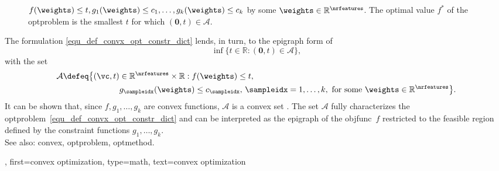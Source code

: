 {{\begin{figure}
{  $f(\weights) \leq t, g_{1}(\weights)\leq c_{1},\ldots, g_{k}(\weights) \leq c_{k}$ 
  by some $\weights \in \mathbb{R}^{\nrfeatures}$. The optimal value $f^{\ast}$ of the 
  \gls{optproblem} is the smallest $t$ for which $(\mathbf{0},t) \in \mathcal{A}$. }
\end{figure}
	The formulation \eqref{equ_def_convx_opt_constr_dict} lends, in turn, to the 
	epigraph form of \cite[Sec 5.3]{BoydConvexBook} 
	$$\inf \big\{ t \in \mathbb{R} : (\mathbf{0}, t) \in \mathcal{A} \big\},$$ 
	with the set 
	\begin{align} 
	\mathcal{A} \defeq 
    \big\{ (\vc,t) & \in \mathbb{R}^{\nrfeatures} \times \mathbb{R} : 
    f(\weights) \leq t, \, \nonumber \\ 
   &  g_{\sampleidx}(\weights) \leq c_{\sampleidx}, \,
    \sampleidx = 1,\ldots,k, 
    \text{ for some } \weights \in \mathbb{R}^{\nrfeatures} \big\}. \nonumber
	\end{align}
	It can be shown that, since $f,g_{1},\ldots,g_{k}$ are \gls{convex} \glspl{function}, 
    $\mathcal{A}$ is a \gls{convex} set \cite[Ch.2]{BoydConvexBook}.
	The set $\mathcal{A}$ fully characterizes the \gls{optproblem}~\eqref{equ_def_convx_opt_constr_dict} 
	and can be interpreted as the \gls{epigraph} of the \gls{objfunc}~$f$ restricted to the 
	feasible region defined by the constraint \glspl{function} $g_1,\ldots,g_k$.\\ 
    See also: \gls{convex}, \gls{optproblem}, \gls{optmethod}.
  },
	first={convex optimization},
	type=math,
  	text={convex optimization}
}

